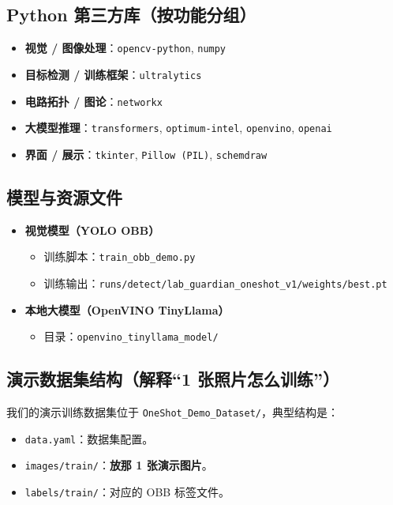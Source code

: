 \documentclass[a4paper,AutoFakeBold,oneside,12pt]{book}
\begin{document}
\subsection{Python 第三方库（按功能分组）}
\begin{itemize}
    \item \textbf{视觉 / 图像处理}：\texttt{opencv-python}, \texttt{numpy}
    \item \textbf{目标检测 / 训练框架}：\texttt{ultralytics}
    \item \textbf{电路拓扑 / 图论}：\texttt{networkx}
    \item \textbf{大模型推理}：\texttt{transformers}, \texttt{optimum-intel}, \texttt{openvino}, \texttt{openai}
    \item \textbf{界面 / 展示}：\texttt{tkinter}, \texttt{Pillow (PIL)}, \texttt{schemdraw}
\end{itemize}

\subsection{模型与资源文件}
\begin{itemize}
    \item \textbf{视觉模型（YOLO OBB）}
    \begin{itemize}
        \item 训练脚本：\texttt{train\_obb\_demo.py}
        \item 训练输出：\texttt{runs/detect/lab\_guardian\_oneshot\_v1/weights/best.pt}
    \end{itemize}
    \item \textbf{本地大模型（OpenVINO TinyLlama）}
    \begin{itemize}
        \item 目录：\texttt{openvino\_tinyllama\_model/}
    \end{itemize}
\end{itemize}

\subsection{演示数据集结构（解释“1 张照片怎么训练”）}
我们的演示训练数据集位于 \texttt{OneShot\_Demo\_Dataset/}，典型结构是：
\begin{itemize}
    \item \texttt{data.yaml}：数据集配置。
    \item \texttt{images/train/}：\textbf{放那 1 张演示图片}。
    \item \texttt{labels/train/}：对应的 OBB 标签文件。
\end{itemize}
\end{document}
